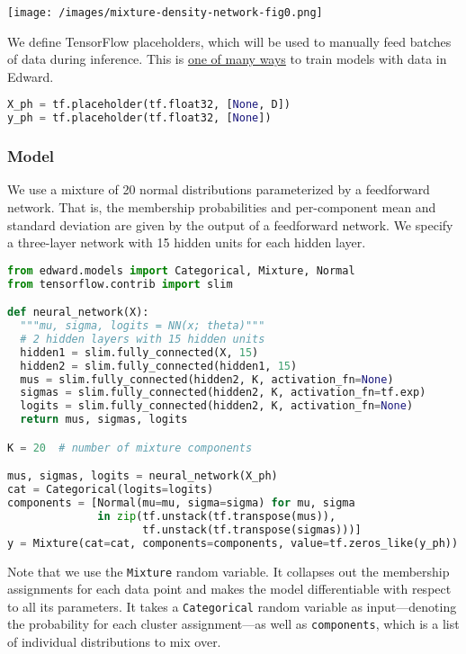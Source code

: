 \texttt{[image: /images/mixture-density-network-fig0.png]}

We define TensorFlow placeholders, which will be used to manually feed batches of data during inference. This is \href{http://edwardlib.org/api/data}{one of many ways} to train models with data in Edward.

\begin{lstlisting}[language=Python]
X_ph = tf.placeholder(tf.float32, [None, D])
y_ph = tf.placeholder(tf.float32, [None])
\end{lstlisting}

\subsubsection{Model}

We use a mixture of 20 normal distributions parameterized by a
feedforward network. That is, the membership probabilities and
per-component mean and standard deviation are given by the output of a
feedforward network.  We specify a three-layer network with 15 hidden
units for each hidden layer.

\begin{lstlisting}[language=Python]
from edward.models import Categorical, Mixture, Normal
from tensorflow.contrib import slim

def neural_network(X):
  """mu, sigma, logits = NN(x; theta)"""
  # 2 hidden layers with 15 hidden units
  hidden1 = slim.fully_connected(X, 15)
  hidden2 = slim.fully_connected(hidden1, 15)
  mus = slim.fully_connected(hidden2, K, activation_fn=None)
  sigmas = slim.fully_connected(hidden2, K, activation_fn=tf.exp)
  logits = slim.fully_connected(hidden2, K, activation_fn=None)
  return mus, sigmas, logits

K = 20  # number of mixture components

mus, sigmas, logits = neural_network(X_ph)
cat = Categorical(logits=logits)
components = [Normal(mu=mu, sigma=sigma) for mu, sigma
              in zip(tf.unstack(tf.transpose(mus)),
                     tf.unstack(tf.transpose(sigmas)))]
y = Mixture(cat=cat, components=components, value=tf.zeros_like(y_ph))
\end{lstlisting}

Note that we use the \texttt{Mixture} random variable. It collapses
out the membership assignments for each data point and makes the model
differentiable with respect to all its parameters. It takes a
\texttt{Categorical} random variable as input—denoting the probability for each
cluster assignment—as well as \texttt{components}, which is a list of
individual distributions to mix over.

